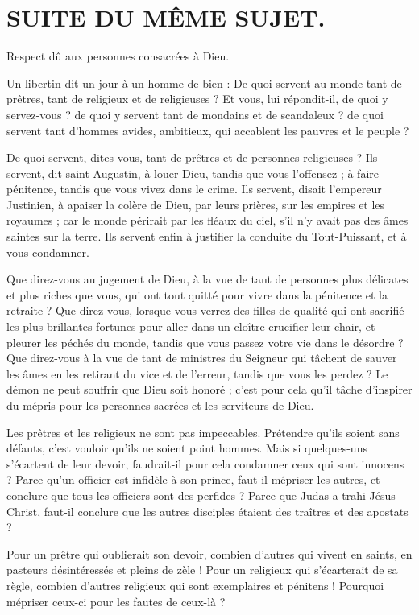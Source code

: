 \documentclass[instructions.tex]{subfiles}
\begin{document}
 
\chapter{SUITE DU MÊME SUJET.}
 
Respect dû aux personnes consacrées à Dieu.
 
\primo Un libertin dit un jour à un homme de bien : De quoi servent au monde tant de prêtres, tant de religieux et de religieuses ? Et vous, lui répondit-il, de quoi y servez-vous ? de quoi y servent tant de mondains et de scandaleux ? de quoi servent tant d'hommes avides, ambitieux, qui accablent les pauvres et le peuple ?
 
De quoi servent, dites-vous, tant de prêtres et de personnes religieuses ? Ils servent, dit saint Augustin, à louer Dieu, tandis que vous l'offensez ; à faire pénitence, tandis que vous vivez dans le crime. Ils servent, disait l'empereur Justinien, à apaiser la colère de Dieu, par leurs prières, sur les empires et les royaumes ; car le monde périrait par les fléaux du ciel, s'il n'y avait pas des âmes saintes sur la terre. Ils servent enfin à justifier la conduite du Tout-Puissant, et à vous condamner.
 
Que direz-vous au jugement de Dieu, à la vue de tant de personnes plus délicates et plus riches que vous, qui ont tout quitté pour vivre dans la pénitence et la retraite ? Que direz-vous, lorsque vous verrez des filles de qualité qui ont sacrifié les plus brillantes fortunes pour aller dans un cloître crucifier leur chair, et pleurer les péchés du monde, tandis que vous passez votre vie dans le désordre ? Que direz-vous à la vue de tant de ministres du Seigneur qui tâchent de sauver les âmes en les retirant du vice et de l'erreur, tandis que vous les perdez ? Le démon ne peut souffrir que Dieu soit honoré ; c'est pour cela qu'il tâche d'inspirer du mépris pour les personnes sacrées et les serviteurs de Dieu.
 
\secundo Les prêtres et les religieux ne sont pas impeccables. Prétendre qu'ils soient sans défauts, c'est vouloir qu'ils ne soient point hommes. Mais si quelques-uns s'écartent de leur devoir, faudrait-il pour cela condamner ceux qui sont innocens ? Parce qu'un officier est infidèle à son prince, faut-il mépriser les autres, et conclure que tous les officiers sont des perfides ? Parce que Judas a trahi Jésus-Christ, faut-il conclure que les autres disciples étaient des traîtres et des apostats ?
 
Pour un prêtre qui oublierait son devoir, combien d'autres qui vivent en saints, en pasteurs désintéressés et pleins de zèle ! Pour un religieux qui s'écarterait de sa règle, combien d'autres religieux qui sont exemplaires et pénitens ! Pourquoi mépriser ceux-ci pour les fautes de ceux-là ?
 
\end{document}
